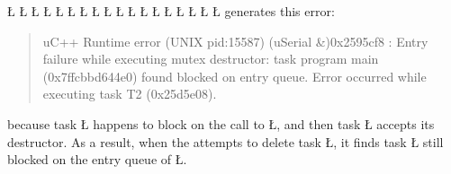 \documentclass[openright,twoside]{report}
\begin{document}
\L{}
\L{\LB{}}
\L{}
\L{\LB{}}
\L{\LB{\};}}
\endlgrinde\LGend
\LGinlinefalse\LGbegin\lgrinde
\L{}
\L{\LB{}}
\L{}
\L{\LB{}}
\L{}
\L{\LB{}}
\L{\LB{\};}}
\endlgrinde\LGend
\LGinlinefalse\LGbegin\lgrinde
\L{}
\L{\LB{}}
\L{\LB{}}
\L{\LB{}}
\L{\LB{}}
\L{\LB{\}}}
\endlgrinde\LGend
generates this error:
\begin{quote}
\BGfont
uC++ Runtime error (UNIX pid:15587) (uSerial \&)0x2595cf8 : Entry failure while executing mutex destructor: task program main (0x7ffcbbd644e0) found blocked on entry queue.
Error occurred while executing task T2 (0x25d5e08).
\end{quote}
because task \LGinlinetrue\LGbegin\lgrinde\L{}\endlgrinde\LGend{} happens to block on the call to \LGinlinetrue\LGbegin\lgrinde\L{}\endlgrinde\LGend{}, and then task \LGinlinetrue\LGbegin\lgrinde\L{}\endlgrinde\LGend{} accepts its destructor.
As a result, when the  attempts to delete task \LGinlinetrue\LGbegin\lgrinde\L{}\endlgrinde\LGend{}, it finds task \LGinlinetrue\LGbegin\lgrinde\L{}\endlgrinde\LGend{} still blocked on the entry queue of \LGinlinetrue\LGbegin\lgrinde\L{}\endlgrinde\LGend{}.
\end{document}
